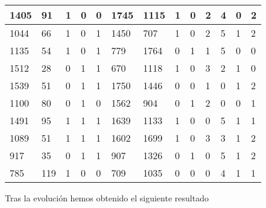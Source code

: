 \begin{table}[H]
\begin{tabular}{|l|l|l|l|l|l|l|l|l|l|l|l|l|}
1405       & 91         & 1          & 0          & 0          & 1745       & 1115       & 1          & 0          & 2           & 4           & 0           & 2           \\ \hline
1044       & 66         & 1          & 0          & 1          & 1450       & 707        & 1          & 0          & 2           & {\color[HTML]{FE0000}5}           & 1           & 2           \\ \hline
1135       & 54         & 1          & 0          & 1          & 779        & 1764       & 0          & 1          & 1           & {\color[HTML]{FE0000}5}           & 0           & 0           \\ \hline
1512       & 28         & 0          & 1          & 1          & 670        & 1118       & 1          & 0          & {\color[HTML]{FE0000}3}           & 2           & 1           & 0           \\ \hline
1539       & 51         & 0          & 1          & 1          & 1750       & 1446       & 0          & 0          & 1           & 0           & 1           & 2           \\ \hline
1100       & 80         & 0          & 1          & 0          & 1562       & 904        & 0          & 1          & 2           & 0           & 0           & 1           \\ \hline
1491       & 95         & 1          & 1          & 1          & 1639       & 1133       & 1          & 0          & 0           & {\color[HTML]{FE0000}5}           & 1           & 1           \\ \hline
1089       & 51         & 1          & 1          & 1          & 1602       & 1699       & 1          & 0          & {\color[HTML]{FE0000}3}           & 3           & 1           & 2           \\ \hline
917        & 35         & 0          & 1          & 1          & 907        & 1326       & 0          & 1          & 0           & {\color[HTML]{FE0000}5}           & 1           & 2           \\ \hline
785        & 119        & 1          & 0          & 0          & 709        & 1035       & 0          & 0          & 0           & 4           & 1           & 1           \\ \hline
\end{tabular}
\end{table}

Tras la evolución hemos obtenido el siguiente resultado

